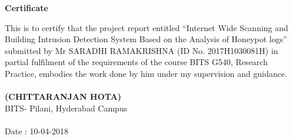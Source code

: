 \documentclass{report}
\begin{document}
\begin{center}
\textbf{\large{Certificate} } \\[20pt]


\end{center}

\begin{flushleft}
This is to certify that the project report entitled “Internet Wide Scanning and Building Intrusion Detection System Based on the Analysis of Honeypot logs” submitted by Mr SARADHI RAMAKRISHNA (ID No. 2017H1030081H) in partial
fulfilment of the requirements of the course BITS G540, Research Practice, embodies
the work done by him under my supervision and guidance.
\end{flushleft}

\paragraph{}
\paragraph{}
\paragraph{}
\paragraph{}
\begin{flushright}
\textbf{(CHITTARANJAN HOTA)} \\[5pt]
BITS- Pilani, Hyderabad Campus
\end{flushright}

\paragraph{}
\begin{flushleft}
Date : 10-04-2018
\end{flushleft}

\thispagestyle{empty}
\newpage







\thispagestyle{empty}
 
\tableofcontents
 
\listoffigures
 
\listoftables

\lstlistoflistings

\newpage
 
\end{document}
